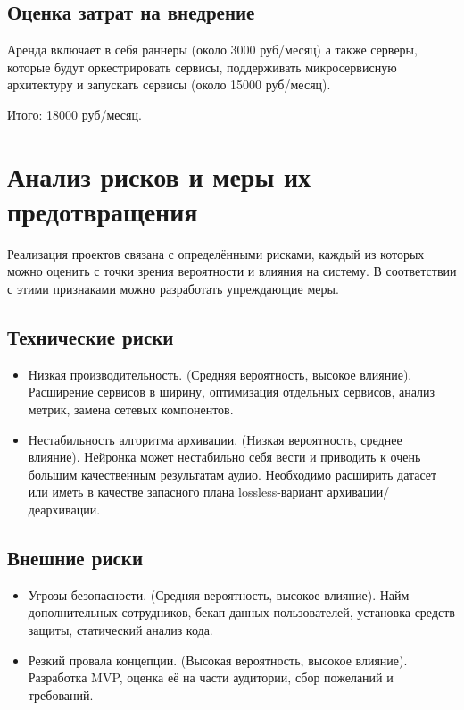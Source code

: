 \documentclass[a4paper,14pt]{extarticle}
\begin{document}
\subsection{Оценка затрат на внедрение}
Аренда включает в себя раннеры (около 3000 руб/месяц) а также серверы, которые 
будут оркестрировать сервисы, поддерживать микросервисную архитектуру и 
запускать сервисы (около 15000 руб/месяц). 

Итого: 18000 руб/месяц.

\section{Анализ рисков и меры их предотвращения}
Реализация проектов связана с определёнными рисками, каждый из которых можно оценить
с точки зрения вероятности и влияния на систему. В соответствии с этими признаками можно 
разработать упреждающие меры. 

\subsection{Технические риски}
\begin{itemize}
    \item Низкая производительность. (Средняя вероятность, высокое влияние). Расширение 
    сервисов в ширину, оптимизация отдельных сервисов, анализ метрик, замена сетевых компонентов.
    \item Нестабильность алгоритма архивации. (Низкая вероятность, среднее влияние). Нейронка
    может нестабильно себя вести и приводить к очень большим качественным результатам аудио. 
    Необходимо расширить датасет или иметь в качестве запасного плана lossless-вариант 
    архивации/деархивации. 
\end{itemize}

\subsection{Внешние риски}
\begin{itemize}
    \item Угрозы безопасности. (Средняя вероятность, высокое влияние). Найм дополнительных сотрудников, 
    бекап данных пользователей, установка средств защиты, статический анализ кода.
    \item Резкий провала концепции. (Высокая вероятность, высокое влияние). Разработка MVP, 
    оценка её на части аудитории, сбор пожеланий и требований.
\end{itemize}
\end{document}
